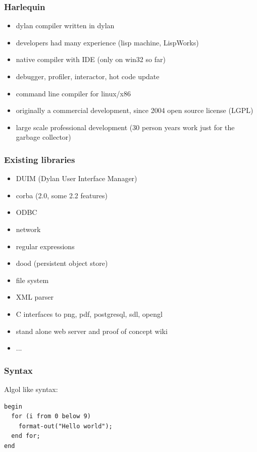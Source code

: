 \documentclass[compress]{beamer}
\begin{document}
\begin{frame}
  \frametitle{Harlequin}
  \begin{itemize}
  \item dylan compiler written in dylan
  \item developers had many experience (lisp machine, LispWorks)
  \item native compiler with IDE (only on win32 so far)
  \item debugger, profiler, interactor, hot code update
  \item command line compiler for linux/x86
  \item originally a commercial development, since 2004 open source license (LGPL)
  \item large scale professional development (30 person years work just for the garbage collector)
  \end{itemize}
\end{frame}

\begin{frame}
  \frametitle{Existing libraries}
  \begin{itemize}
  \item DUIM (Dylan User Interface Manager)
  \item corba (2.0, some 2.2 features)
  \item ODBC
  \item network
  \item regular expressions
  \item dood (persistent object store)
  \item file system
  \item XML parser
  \item C interfaces to png, pdf, postgresql, sdl, opengl
  \item stand alone web server and proof of concept wiki
  \item ...
  \end{itemize}
\end{frame}


\begin{frame}[fragile]
  \frametitle{Syntax}
Algol like syntax:
  \begin{verbatim}
begin
  for (i from 0 below 9)
    format-out("Hello world");
  end for;
end
  \end{verbatim}
\end{frame}
\end{document}
